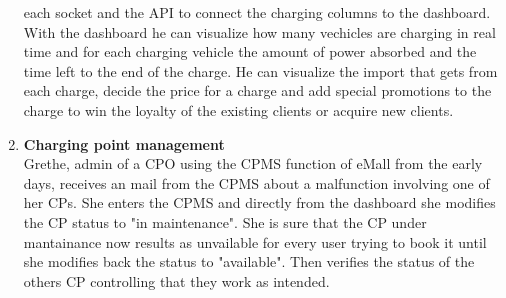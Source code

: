 \begin{enumerate}[label=\textbf{\Alph*}.]
            each socket and the API to connect the charging columns to the dashboard. With the dashboard he can visualize how many vechicles are charging in real time
            and for each charging vehicle the amount of power absorbed and the time left to the end of the charge. He can visualize the import that gets from each
            charge, decide the price for a charge and add special promotions to the charge to win the loyalty of the existing clients or acquire new clients.
      \item \textbf{Charging point management} \\
            Grethe, admin of a CPO using the CPMS function of eMall from the early days, receives an mail from the CPMS about a malfunction involving one of her CPs.
            She enters the CPMS and directly from the dashboard she modifies the CP status to "in maintenance".
            She is sure that the CP under mantainance now results as unvailable for every user trying to book it until she modifies back the status to "available".
            Then verifies the status of the others CP controlling that they work as intended.
\end{enumerate}

